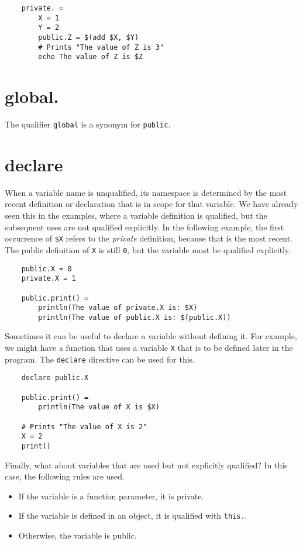 \begin{verbatim}
    private. =
        X = 1
        Y = 2
        public.Z = $(add $X, $Y)
        # Prints "The value of Z is 3"
        echo The value of Z is $Z
\end{verbatim}

\section{global.}
\label{section:global}

\newinreorg

The qualifier \verb+global+ is a synonym for \verb+public+.

\section{declare}
\label{section:declare}

When a variable name is unqualified, its namespace is determined by the most recent definition or
declaration that is in scope for that variable.  We have already seen this in the examples, where a
variable definition is qualified, but the subsequent uses are not qualified explicitly.  In the
following example, the first occurrence of \verb+$X+ refers to the \emph{private} definition,
because that is the most recent.  The public definition of \verb+X+ is still \verb+0+, but the
variable must be qualified explicitly.

\begin{verbatim}
    public.X = 0
    private.X = 1
    
    public.print() =
        println(The value of private.X is: $X)
        println(The value of public.X is: $(public.X))
\end{verbatim}
%
Sometimes it can be useful to declare a variable without defining it.  For example, we might have a
function that uses a variable \verb+X+ that is to be defined later in the program.  The
\verb+declare+ directive can be used for this.

\begin{verbatim}
    declare public.X

    public.print() =
        println(The value of X is $X)

    # Prints "The value of X is 2"
    X = 2
    print()
\end{verbatim}

Finally, what about variables that are used but not explicitly qualified?  In this case, the following rules are used.

\begin{itemize}
\item If the variable is a function parameter, it is private.
\item If the variable is defined in an object, it is qualified with \verb+this.+.
\item Otherwise, the variable is public.
\end{itemize}

